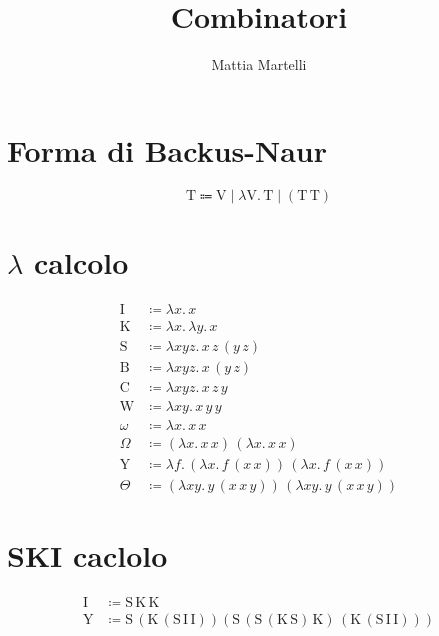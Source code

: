 \documentclass{article}
\author{Mattia Martelli}
\date{}
\title{Combinatori}
\begin{document}
    
    \maketitle

    \section*{Forma di Backus-Naur}

        \[
            \mathrm{T} \Coloneqq \mathrm{V} \; | \; \lambda \mathrm{V} . \, \mathrm{T} \; | \; (\mathrm{T} \, \mathrm{T})
        \]

    \section*{\(\lambda\) calcolo}

        \begin{align*}
            \mathrm{I} &\coloneqq \lambda x . \, x\\
            \mathrm{K} &\coloneqq \lambda x . \, \lambda y . \, x\\
            \mathrm{S} &\coloneqq \lambda xyz . \, x \, z \, (y \, z)\\
            \mathrm{B} &\coloneqq \lambda xyz . \, x \, (y \, z)\\
            \mathrm{C} &\coloneqq \lambda xyz . \, x \, z \, y\\
            \mathrm{W} &\coloneqq \lambda xy . \, x \, y \, y\\
            \omega &\coloneqq \lambda x . \, x \, x\\
            \Omega &\coloneqq (\lambda x . \, x \, x) \, (\lambda x . \, x \, x)\\
            \mathrm{Y} &\coloneqq \lambda f . \, (\lambda x . \, f \, (x \, x)) \, (\lambda x . \, f \, (x \, x))\\
            \Theta &\coloneqq (\lambda xy . \, y \, (x \, x \, y)) \, (\lambda xy . \, y \, (x \, x \, y))
        \end{align*}

    \section*{SKI caclolo}

        \begin{align*}
            \mathrm{I} &\coloneqq \mathrm{S} \, \mathrm{K} \, \mathrm{K}\\
            \mathrm{Y} &\coloneqq \mathrm{S} \, (\mathrm{K} \, (\mathrm{S} \, \mathrm{I} \, \mathrm{I})) (\mathrm{S} \, (\mathrm{S} \, (\mathrm{K} \, \mathrm{S}) \, \mathrm{K}) \, (\mathrm{K} \, (\mathrm{S} \, \mathrm{I} \, \mathrm{I})))
        \end{align*}
\end{document}
